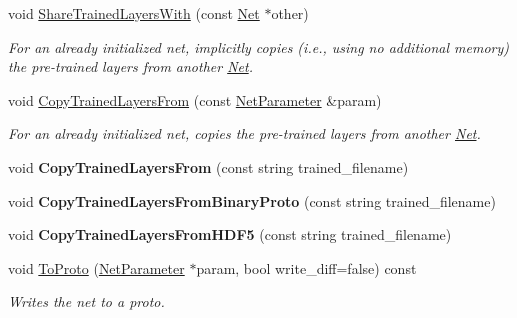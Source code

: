 \begin{DoxyCompactItemize}
\mbox{\label{classcaffe_1_1_net_a3661ca5f30bf8e731cb54cfc3c320023}} 
void \mbox{\hyperlink{classcaffe_1_1_net_a3661ca5f30bf8e731cb54cfc3c320023}{Share\+Trained\+Layers\+With}} (const \mbox{\hyperlink{classcaffe_1_1_net}{Net}} $\ast$other)
\begin{DoxyCompactList}\small\item\em For an already initialized net, implicitly copies (i.\+e., using no additional memory) the pre-\/trained layers from another \mbox{\hyperlink{classcaffe_1_1_net}{Net}}. \end{DoxyCompactList}\item 
\mbox{\label{classcaffe_1_1_net_a4ac2b69748470f54d530bc5dfa05b9c3}} 
void \mbox{\hyperlink{classcaffe_1_1_net_a4ac2b69748470f54d530bc5dfa05b9c3}{Copy\+Trained\+Layers\+From}} (const \mbox{\hyperlink{classcaffe_1_1_net_parameter}{Net\+Parameter}} \&param)
\begin{DoxyCompactList}\small\item\em For an already initialized net, copies the pre-\/trained layers from another \mbox{\hyperlink{classcaffe_1_1_net}{Net}}. \end{DoxyCompactList}\item 
\mbox{\label{classcaffe_1_1_net_ad5e222ad89011558cee681133e5c610b}} 
void {\bfseries Copy\+Trained\+Layers\+From} (const string trained\+\_\+filename)
\item 
\mbox{\label{classcaffe_1_1_net_ad9bb09568db19316e9604eb8cbd15f6d}} 
void {\bfseries Copy\+Trained\+Layers\+From\+Binary\+Proto} (const string trained\+\_\+filename)
\item 
\mbox{\label{classcaffe_1_1_net_ab84341fd27c8c573f00c517bea051c2b}} 
void {\bfseries Copy\+Trained\+Layers\+From\+H\+D\+F5} (const string trained\+\_\+filename)
\item 
\mbox{\label{classcaffe_1_1_net_a6ce42e3be6f7b495fe2fea85db2e99f8}} 
void \mbox{\hyperlink{classcaffe_1_1_net_a6ce42e3be6f7b495fe2fea85db2e99f8}{To\+Proto}} (\mbox{\hyperlink{classcaffe_1_1_net_parameter}{Net\+Parameter}} $\ast$param, bool write\+\_\+diff=false) const
\begin{DoxyCompactList}\small\item\em Writes the net to a proto. \end{DoxyCompactList}\item 

\end{DoxyCompactItemize}
